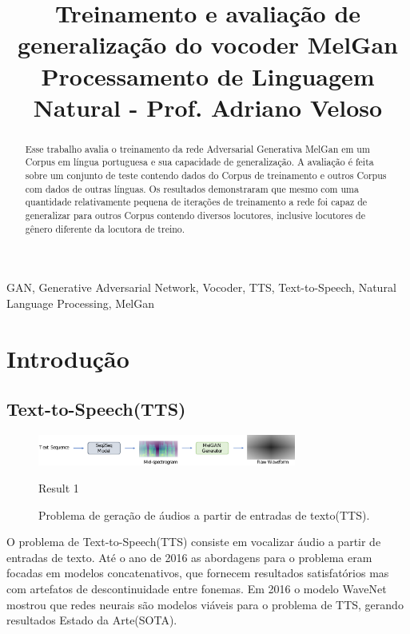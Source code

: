 \documentclass{article}
\title{Treinamento e avaliação de generalização do vocoder MelGan \\ \normalsize{Processamento de Linguagem Natural - Prof. Adriano Veloso}}
\begin{document}
%
\maketitle
%
\begin{abstract}
Esse trabalho avalia o treinamento da rede Adversarial Generativa MelGan\cite{melgan} em um Corpus em língua portuguesa e sua capacidade de generalização. A avaliação é feita sobre um conjunto de teste contendo dados do Corpus de treinamento e outros Corpus com dados de outras línguas. Os resultados demonstraram que mesmo com uma quantidade relativamente pequena de iterações de treinamento a rede foi capaz de generalizar para outros Corpus contendo diversos locutores, inclusive locutores de gênero diferente da locutora de treino.
\end{abstract}
%
\begin{keywords}
GAN, Generative Adversarial Network, Vocoder, TTS, Text-to-Speech, Natural Language Processing, MelGan
\end{keywords}
%
\section{Introdução}
\label{sec:intro}

\subsection{Text-to-Speech(TTS)}

\begin{figure}[H]
	\begin{minipage}[b]{1.0\linewidth}
		\centering
		\centerline{\includegraphics[width=8.5cm]{Figures/tts.eps}}
		\centerline{Result 1}\medskip
	\end{minipage}
	\caption{Problema de geração de áudios a partir de entradas de texto(TTS).}
	\label{fig:res}
\end{figure}

O problema de Text-to-Speech(TTS) consiste em vocalizar áudio a partir de entradas de texto. Até o ano de 2016 as abordagens para o problema eram focadas em modelos concatenativos, que fornecem resultados satisfatórios mas com artefatos de descontinuidade entre fonemas. Em 2016 o modelo WaveNet\cite{wavenet} mostrou que redes neurais são modelos viáveis para o problema de TTS, gerando resultados Estado da Arte(SOTA). 
\end{document}
